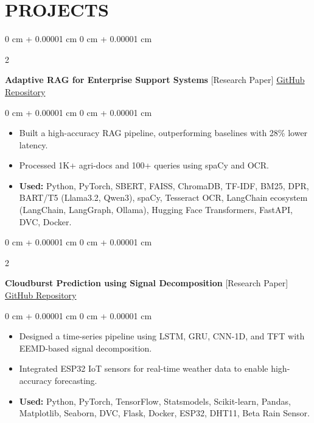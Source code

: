 \documentclass[10pt, letterpaper]{article}
\newenvironment{highlights}{
    \begin{itemize}[
        topsep=0.10 cm,
        parsep=0.10 cm,
        partopsep=0pt,
        itemsep=0pt,
        leftmargin=0 cm + 10pt
    ]
}{
    \end{itemize}
} %
\newenvironment{onecolentry}{
    \begin{adjustwidth}{
        0 cm + 0.00001 cm
    }{
        0 cm + 0.00001 cm
    }
}{
    \end{adjustwidth}
} %
\newenvironment{twocolentry}[2][]{
    \onecolentry
    \def\secondColumn{#2}
    \setcolumnwidth{\fill, 4 cm}
    \begin{paracol}{2}
}{
    \switchcolumn \raggedleft \secondColumn
    \end{paracol}
    \endonecolentry
} %
\begin{document}
    
    \section{PROJECTS}

        \begin{twocolentry}{
            \href{https://github.com/Kshitijk14/rag_for_query_resolution}{GitHub Repository}
        }
            \textbf{Adaptive RAG for Enterprise Support Systems} [Research Paper]\end{twocolentry}

        \vspace{0.10 cm}
        \begin{onecolentry}
            \begin{highlights}
                \item Built a high-accuracy RAG pipeline, outperforming baselines with 28\% lower latency.
                \item Processed 1K+ agri-docs and 100+ queries using spaCy and OCR.
                \item \textbf{Used:} Python, PyTorch, SBERT, FAISS, ChromaDB, TF-IDF, BM25, DPR, BART/T5 (Llama3.2, Qwen3), spaCy, Tesseract OCR, LangChain ecosystem (LangChain, LangGraph, Ollama), Hugging Face Transformers, FastAPI, DVC, Docker.
            \end{highlights}
        \end{onecolentry}


        \vspace{0.2 cm}

        \begin{twocolentry}{
            \href{https://github.com/Kshitijk14/model-cloud-burst}{GitHub Repository}
        }
            \textbf{Cloudburst Prediction using Signal Decomposition} [Research Paper]\end{twocolentry}

        \vspace{0.10 cm}
        \begin{onecolentry}
            \begin{highlights}
                \item Designed a time-series pipeline using LSTM, GRU, CNN-1D, and TFT with EEMD-based signal decomposition.
                \item Integrated ESP32 IoT sensors for real-time weather data to enable high-accuracy forecasting.
                \item \textbf{Used:} Python, PyTorch, TensorFlow, Statsmodels, Scikit-learn, Pandas, Matplotlib, Seaborn, DVC, Flask, Docker, ESP32, DHT11, Beta Rain Sensor.
            \end{highlights}
        \end{onecolentry}
\end{document}
